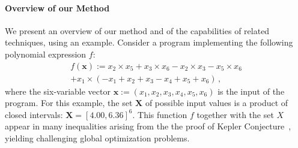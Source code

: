 \documentclass[preprint]{sigplanconf}
\newcommand{\x}{\mathbf{x}}
\def\X{\mathbf{X}}
\theoremstyle{plain}
\begin{document}
\paragraph{Overview of our Method}
%
We present an overview of our method and of the capabilities of related techniques, using an example.
Consider a program implementing the following polynomial expression $f$:
\begin{align*}
f(\x) := x_2 \times x_5 + x_3 \times x_6 - x_2 \times x_3  - x_5 \times x_6 \\
+ x_1 \times ( - x_1 +  x_2 +  x_3  - x_4 +  x_5 +  x_6) \,,
\end{align*}
%
where the six-variable vector $\x :=  (x_1, x_2, x_3, x_4, x_5, x_6)$ is the input of the program. For this example, the set $\X$ of possible input values is a product of closed intervals: $\X = [4.00, 6.36]^6$.
This function $f$ together with the set $X$ appear in many inequalities arising from the the proof of Kepler Conjecture~\cite{halesalgo}, yielding challenging global optimization problems.

\end{document}
